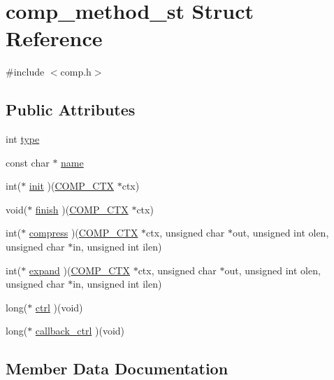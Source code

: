 \hypertarget{structcomp__method__st}{}\section{comp\+\_\+method\+\_\+st Struct Reference}
\label{structcomp__method__st}


{\ttfamily \#include $<$comp.\+h$>$}

\subsection*{Public Attributes}
\begin{DoxyCompactItemize}
\item 
int \hyperlink{structcomp__method__st_a398382b23088b56dc05184016dfe247c}{type}
\item 
const char $\ast$ \hyperlink{structcomp__method__st_a2331b9bae2f1539bab8e75efc58283b1}{name}
\item 
int($\ast$ \hyperlink{structcomp__method__st_af175cb97f5906c4298b88c65507a8a64}{init} )(\hyperlink{comp_8h_a9aa3298bb113c7c8e26a4f5cb9efb6d5}{C\+O\+M\+P\+\_\+\+C\+TX} $\ast$ctx)
\item 
void($\ast$ \hyperlink{structcomp__method__st_af6a0a033a48d84fad2cfd6776f4c2dfc}{finish} )(\hyperlink{comp_8h_a9aa3298bb113c7c8e26a4f5cb9efb6d5}{C\+O\+M\+P\+\_\+\+C\+TX} $\ast$ctx)
\item 
int($\ast$ \hyperlink{structcomp__method__st_ad894ddf63c5ec8904fc9ea47d138fbac}{compress} )(\hyperlink{comp_8h_a9aa3298bb113c7c8e26a4f5cb9efb6d5}{C\+O\+M\+P\+\_\+\+C\+TX} $\ast$ctx, unsigned char $\ast$out, unsigned int olen, unsigned char $\ast$in, unsigned int ilen)
\item 
int($\ast$ \hyperlink{structcomp__method__st_a553b3c0860205e265266e958eba563af}{expand} )(\hyperlink{comp_8h_a9aa3298bb113c7c8e26a4f5cb9efb6d5}{C\+O\+M\+P\+\_\+\+C\+TX} $\ast$ctx, unsigned char $\ast$out, unsigned int olen, unsigned char $\ast$in, unsigned int ilen)
\item 
long($\ast$ \hyperlink{structcomp__method__st_a1759ea60f1c12ec6d9489855b78b1463}{ctrl} )(void)
\item 
long($\ast$ \hyperlink{structcomp__method__st_a56f1252386d5b98a5560b1ada313ce09}{callback\+\_\+ctrl} )(void)
\end{DoxyCompactItemize}


\subsection{Member Data Documentation}
